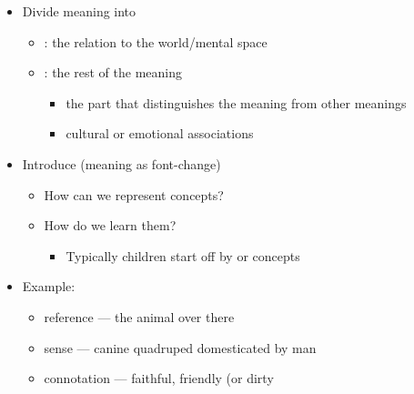 \documentclass[a4paper,landscape,headrule,footrule,xetex]{foils}
\begin{document}

\begin{itemize}
\item Divide meaning into
  \begin{itemize}
  \item {}: the relation to the world/mental space
  \item {}: the rest of the meaning
    \begin{itemize}
    \item {} the part that distinguishes the meaning
      from other meanings
    \item {}  cultural or emotional associations 
    \end{itemize}
  \end{itemize}
\item Introduce  \hfill (meaning as font-change)
  \begin{itemize}
  \item How can we represent concepts?
  \item How do we learn them?
    \begin{itemize}
    \item Typically children start off by  or  concepts
    \end{itemize}
  \end{itemize}
\item Example: 
  \begin{itemize}
  \item reference --- the animal over there
  \item sense --- canine quadruped domesticated by man
  \item connotation --- faithful, friendly (or dirty
  \end{itemize}
\end{itemize}




\end{document}
